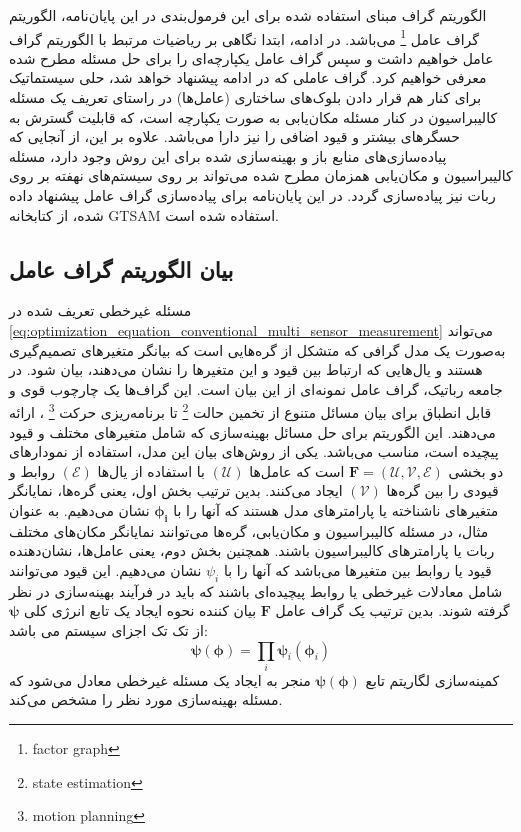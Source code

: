 الگوریتم گراف مبنای استفاده شده برای این فرمول‌بندی در این پایان‌نامه، الگوریتم گراف عامل
\footnote{factor graph}
می‌باشد. در ادامه، ابتدا نگاهی بر ریاضیات مرتبط با الگوریتم گراف عامل خواهیم داشت و سپس گراف عامل یکپارچه‌ای را برای حل مسئله مطرح شده معرفی خواهیم کرد. گراف عاملی که در ادامه پیشنهاد خواهد شد، حلی سیستماتیک برای کنار هم قرار دادن بلوک‌های ساختاری (عامل‌ها) در راستای تعریف یک مسئله کالیبراسیون در کنار مسئله مکان‌یابی به صورت یکپارچه است، که قابلیت گسترش به حسگرهای بیشتر و قیود اضافی را نیز دارا می‌باشد. علاوه بر این، از آنجایی که پیاده‌سازی‌های منابع باز و بهینه‌سازی شده برای این روش وجود دارد، مسئله کالیبراسیون و مکان‌یابی همزمان مطرح شده می‌تواند بر روی سیستم‌های نهفته بر روی ربات نیز پیاده‌سازی گردد. در این پایان‌نامه برای پیاده‌سازی گراف عامل پیشنهاد داده شده، از کتابخانه GTSAM استفاده شده است. 

\subsection{بیان الگوریتم گراف عامل}
مسئله غیرخطی تعریف شده در 
\ref{eq:optimization_equation_conventional_multi_sensor_measurement}
می‌تواند به‌صورت یک مدل گرافی که متشکل از گره‌هایی است که بیانگر متغیرهای تصمیم‌گیری هستند و یال‌هایی که ارتباط بین قیود و این متغیرها را نشان می‌دهند، بیان شود. در جامعه رباتیک، گراف عامل نمونه‌ای از این بیان است. این گراف‌ها یک چارچوب قوی و قابل انطباق برای بیان مسائل متنوع از تخمین حالت
\footnote{state estimation}
 تا برنامه‌ریزی حرکت
\footnote{motion planning}
 ، ارائه می‌دهند.  این الگوریتم برای حل مسائل بهینه‌سازی که شامل متغیرهای مختلف و قیود پیچیده است، مناسب می‌باشد. یکی از روش‌های بیان این مدل، استفاده از نمودارهای دو بخشی
$\boldsymbol{F} = (\mathcal{U}, \mathcal{V}, \mathcal{E})$
است که  عامل‌ها 
$(\mathcal{U})$
با استفاده از یال‌ها
$(\mathcal{E})$
روابط و قیودی را بین گره‌ها 
$(\mathcal{V})$
 ایجاد می‌کنند. بدین ترتیب بخش اول، یعنی گره‌ها، نمایانگر متغیرهای ناشناخته یا پارامترهای مدل هستند که آنها را با
$\boldsymbol{\phi_i}$
نشان می‌دهیم. به عنوان مثال، در مسئله کالیبراسیون و مکان‌یابی، گره‌ها می‌توانند نمایانگر مکان‌های مختلف ربات یا پارامترهای کالیبراسیون باشند. همچنین بخش دوم، یعنی عامل‌ها، نشان‌دهنده قیود یا روابط بین متغیرها می‌باشد که آنها را با
$\psi_i$
نشان می‌دهیم. این قیود می‌توانند شامل معادلات غیرخطی یا روابط پیچیده‌ای باشند که باید در فرآیند بهینه‌سازی در نظر گرفته شوند. بدین ترتیب یک گراف عامل 
$\boldsymbol{F}$
بیان کننده نحوه ایجاد یک تابع انرژی کلی
$\boldsymbol{\psi}$
از تک تک اجزای سیستم می باشد:
\begin{equation} 
	\boldsymbol{\psi}(\boldsymbol{\phi}) = \prod_{i} \boldsymbol{\psi}_i(\boldsymbol{\phi}_i) 
\end{equation}
کمینه‌سازی لگاریتم تابع 
$\boldsymbol{\psi}(\boldsymbol{\phi})$
منجر به ایجاد یک مسئله غیرخطی معادل می‌شود که مسئله بهینه‌سازی مورد نظر را مشخص می‌کند.


